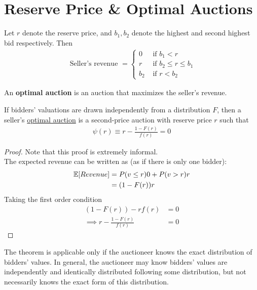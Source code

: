 \documentclass{article}
\begin{document}
	\section{Reserve Price \& Optimal Auctions}
	\par Let $r$ denote the reserve price, and $b_1, b_2$ denote the highest and second highest bid respectively. Then
	\begin{align}
		\text { Seller's revenue }=\left\{\begin{array}{ll}
		{0} & {\text { if } b_{1}<r} \\
		{r} & {\text { if } b_{2} \leq r \leq b_{1}} \\
		{b_{2}} & {\text { if } r<b_{2}}
		\end{array}\right.
	\end{align}
	
	\begin{definition}
		An \textbf{optimal auction} is an auction that maximizes the seller's revenue.
	\end{definition}
	
	\begin{theorem}
		If bidders' valuations are drawn independently from a distribution $F$, then a seller's \ul{optimal auction} is a  second-price auction with reserve price $r$ such that
		\begin{align}
			\psi(r) \equiv r - \frac{1 - F(r)}{f(r)} = 0
		\end{align}
	\end{theorem}
	
	\begin{proof}
		Note that this proof is extremely informal. \\
		The expected revenue can be written as (as if there is only one bidder):
		\begin{align}
			\mathbb{E}[{Revenue}]
			&= P(v \leq r) 0 + P(v > r) r \\
			&= (1 - F(r)) r
		\end{align}
		Taking the first order condition
		\begin{align}
			(1 - F(r)) - r f(r) &= 0 \\
			\implies r - \frac{1 - F(r)}{f(r)} &= 0
		\end{align}
	\end{proof}
	
	\begin{remark}
		The theorem is applicable only if the auctioneer knows the exact distribution of bidders' values. In general, the auctioneer may know bidders' values are independently and identically distributed following some distribution, but not necessarily knows the exact form of this distribution.
	\end{remark}
	
\end{document}
